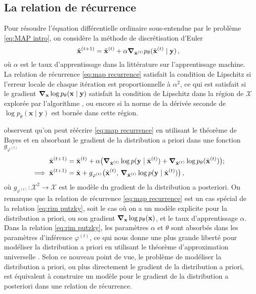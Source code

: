 \subsection{La relation de récurrence}
Pour résoudre l'équation différentielle ordinaire sous-entendue par le problème \eqref{eq:MAP intro}, 
on considère la méthode de discrétisation d'Euler 
\begin{equation}\label{eq:map recurrence}
        \hat{\mathbf{x}}^{(t+1)} = \hat{\mathbf{x}}^{(t)} + \alpha \grad_{\hat{\mathbf{x}}^{(t)}} p_\theta(\hat{\mathbf{x}}^{(t)} \mid \mathbf{y})\, ,
\end{equation} 
où $\alpha$ est le taux d'apprentissage dans la littérature sur 
l'apprentissage machine.
La relation de récurrence \eqref{eq:map recurrence} satisfait la condition de Lipschitz 
si l'erreur locale de chaque itération est proportionnelle à $\alpha^{2}$, ce qui est 
satisfait si le gradient $\grad_{\mathbf{x}}\log p_\theta(\mathbf{x} \mid \mathbf{y})$ 
satisfait la condition de Lipschitz dans la région de $\mathcal{X}$ explorée par l'algorithme \citep{Atkinson1989,Butcher2016}, 
ou encore si la norme de la dérivée seconde de $\log p_\theta(\mathbf{x} \mid \mathbf{y})$ est bornée dans cette région.

\citet{Putzky2017} observent qu'on peut réécrire \eqref{eq:map recurrence} en utilisant le théorème de Bayes et 
en absorbant le gradient de la distribution a priori dans une fonction $g_{\varphi^{(t)}}$
\begin{align}
        \hat{\mathbf{x}}^{(t+1)} &= 
        \hat{\mathbf{x}}^{(t)} + \alpha \big( \grad_{\hat{\mathbf{x}}^{(t)}}\log p(\mathbf{y} \mid \hat{\mathbf{x}}^{(t)}) 
        +  \grad_{\hat{\mathbf{x}}^{(t)}}\log p_\theta(\hat{\mathbf{x}}^{(t)})\big);\\
        \label{eq:rim putzky}
        \implies \hat{\mathbf{x}}^{(t+1)} &= \hat{\mathbf{x}} + g_{\varphi^{(t)}}\big(\hat{\mathbf{x}}^{(t)},\, \grad_{\hat{\mathbf{x}}^{(t)}} \log p(\mathbf{y} \mid \hat{\mathbf{x}}^{(t)})\big)\, ,
\end{align}
où $g_{\varphi^{(t)}}: \mathcal{X}^{2} \rightarrow \mathcal{X}$ est le modèle du gradient de la distribution 
a posteriori. 
On remarque que la relation de récurrence \eqref{eq:map recurrence} est un cas spécial de la relation \eqref{eq:rim putzky}, 
soit le cas où on a un modèle explicite pour la distribution a priori, ou son gradient $\grad_{\mathbf{x}} \log p_\theta(\mathbf{x})$,
et le taux d'apprentissage $\alpha$. 
Dans la relation \eqref{eq:rim putzky}, les paramètres $\alpha$ et $\theta$ sont absorbés dans les paramètres d'inférence $\varphi^{(t)}$, ce qui nous donne 
une plus grande liberté pour modéliser la distribution a priori en utilisant le théorème d'approximation universelle \citep{Cybenko1989,Hornik1991}. 
Selon ce nouveau point de vue, 
le problème de modéliser la distribution a priori, ou plus directement le gradient de la distribution a priori, 
est équivalent à construire un modèle pour le gradient de la distribution a posteriori dans une relation 
de récurrence.


